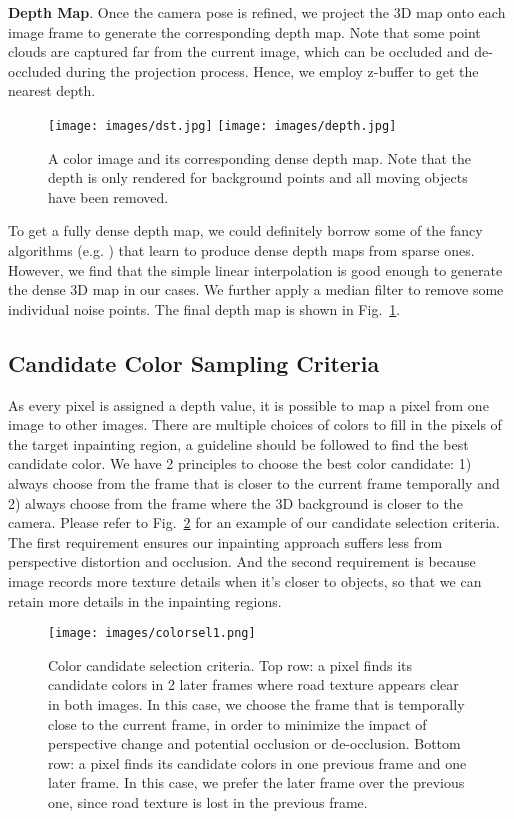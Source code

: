 \documentclass[runningheads]{llncs}
\begin{document}
\textbf{Depth Map}. Once the camera pose is refined, we project the 3D map onto each image frame to generate the corresponding depth map. Note that some point clouds are captured far from the current image, which can be occluded and de-occluded during the projection process. Hence, we employ z-buffer to get the nearest depth.

\begin{figure}[t!]
\centering
\texttt{[image: images/dst.jpg]}
\texttt{[image: images/depth.jpg]}
   \caption{A color image and its corresponding dense depth map. Note that the depth is only rendered for background points and all moving objects have been removed.}
\label{fig:depthmap}
\end{figure}

To get a fully dense depth map, we could definitely borrow some of the fancy algorithms (e.g. \cite{cheng2018depth}) that learn to produce dense depth maps from sparse ones. However, we find that the simple linear interpolation is good enough to generate the dense 3D map in our cases. We further apply a  median filter to remove some individual noise points. The final depth map is shown in Fig.~\ref{fig:depthmap}.


\subsection{Candidate Color Sampling Criteria}

As every pixel is assigned a depth value, it is possible to map a pixel from one image to other images. There are multiple choices of colors to fill in the pixels of the target inpainting region, a guideline should be followed to find the best candidate color. We have 2 principles to choose the best color candidate: 1) always choose from the frame that is closer to the current frame temporally and 2) always choose from the frame where the 3D background is closer to the camera. Please refer to Fig.~\ref{fig:colorsel} for an example of our candidate selection criteria. The first requirement ensures our inpainting approach suffers less from perspective distortion and occlusion. And the second requirement is because image records more texture details when it's closer to objects, so that we can retain more details in the inpainting regions.

\begin{figure}[t!]
\centering
\texttt{[image: images/colorsel1.png]}
   \caption{Color candidate selection criteria. Top row: a pixel finds its candidate colors in 2 later frames where road texture appears clear in both images. In this case, we choose the frame that is temporally close to the current frame, in order to minimize the impact of perspective change and potential occlusion or de-occlusion. Bottom row: a pixel finds its candidate colors in one previous frame and one later frame. In this case, we prefer the later frame over the previous one, since road texture is lost in the previous frame.}
\label{fig:colorsel}
\end{figure}
\end{document}
